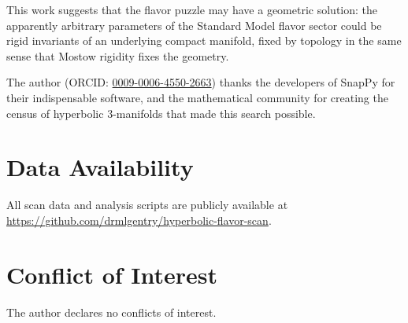 \documentclass[epjc3]{svjour3}
\begin{document}
This work suggests that the flavor puzzle may have a geometric 
solution: the apparently arbitrary parameters of the Standard Model 
flavor sector could be rigid invariants of an underlying compact 
manifold, fixed by topology in the same sense that Mostow rigidity 
fixes the geometry.

\begin{acknowledgement}
The author (ORCID: \href{https://orcid.org/0009-0006-4550-2663}{0009-0006-4550-2663})
thanks the developers of SnapPy for their indispensable
software, and the mathematical community for creating the census of
hyperbolic 3-manifolds that made this search possible.
\end{acknowledgement}


\section*{Data Availability}
All scan data and analysis scripts are publicly available at \url{https://github.com/drmlgentry/hyperbolic-flavor-scan}.

\section*{Conflict of Interest}
The author declares no conflicts of interest.
\end{document}

